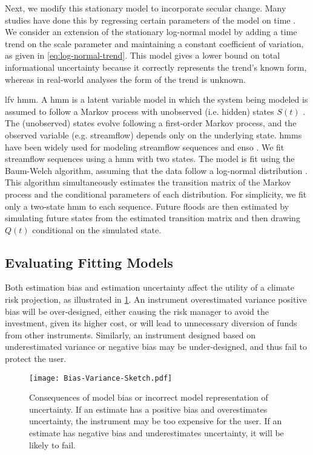 \documentclass[
  draft,
  linenumbers
]{agujournal2018}
\makeatletter
\newcommand{\eg}{e.g.\@\xspace}
\newcommand{\ie}{i.e.\@\xspace}
\makeatother
\begin{document}
Next, we modify this stationary model to incorporate secular change.
Many studies have done this by regressing certain parameters of the model on time \citep[see][for a comprehensive review]{Salas:2018ge}.
We consider an extension of the stationary log-normal model by adding a time trend on the scale parameter and maintaining a constant coefficient of variation, as given in \cref{eq:log-normal-trend}.
This model gives a lower bound on total informational uncertainty because it correctly represents the trend's known form, whereas in real-world analyses the form of the trend is unknown.

 \gls{lfv}  \gls{hmm}.
A \gls{hmm} is a latent variable model in which the system being modeled is assumed to follow a Markov process with unobserved (\ie hidden) states $S(t)$ \citep{Rabiner:1986jk}.
The (unobserved) states evolve following a first-order Markov process, and the observed variable (\eg streamflow) depends only on the underlying state.
\Glspl{hmm} have been widely used for modeling streamflow sequences \citep{Bracken:2016ba} and \gls{enso} \citep{rojohernandez:2017}.
We fit  streamflow sequences using a \gls{hmm} with two states.
The model is fit using the Baum-Welch algorithm, assuming that the data follow a log-normal distribution .
This algorithm simultaneously estimates the transition matrix of the Markov process and the conditional parameters of each distribution.
For simplicity, we fit only a two-state \gls{hmm} to each sequence.
Future floods are then estimated by simulating future states from the estimated transition matrix and then drawing $Q(t)$ conditional on the simulated state.

\subsection{Evaluating Fitting Models}\label{sec:methods-evaluating}

Both estimation bias and estimation uncertainty affect the utility of a climate risk projection, as illustrated in \cref{fig:conceptual-bias-variance}.
An instrument   overestimated variance  positive bias will be over-designed, either causing the risk manager to avoid the investment, given its higher cost, or will lead to unnecessary diversion of funds from other instruments.
Similarly, an instrument designed based on underestimated variance or negative bias may be under-designed, and thus fail to protect the user.
\begin{figure}
  \centering
  \texttt{[image: Bias-Variance-Sketch.pdf]}
  \caption{
    Consequences of model bias or incorrect model representation of uncertainty.
    If an estimate has a positive bias and overestimates uncertainty, the instrument may be too expensive for the user.
    If an estimate has negative bias and underestimates uncertainty, it will be likely to fail.
  }\label{fig:conceptual-bias-variance}
\end{figure}
\end{document}
